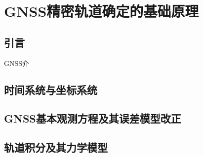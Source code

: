 
\chapter{GNSS精密轨道确定的基础原理}

\section{引言}
GNSS介

\section{时间系统与坐标系统}

\section{GNSS基本观测方程及其误差模型改正}

\section{轨道积分及其力学模型}